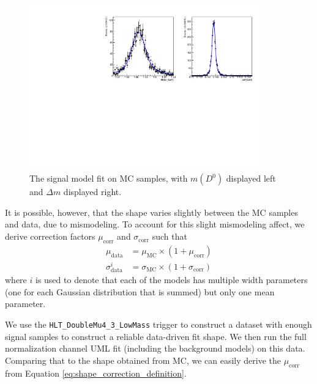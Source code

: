 \begin{figure}[htp]
    \begin{center}
      \includegraphics[width=0.9\textwidth]{figures/chapter4/normalization_fit/dpipi_fit_mc.pdf}
    \end{center}
    \caption{
      The signal model fit on MC samples, with $m(D^0)$ displayed left and $\Delta m$ displayed right.
    }
    \label{fig:d0pipi_uml_fit_pipi_model}
\end{figure}

It is possible, however, that the shape varies slightly between the MC samples and data, due to mismodeling. To account for this slight mismodeling affect, we derive correction factors $\mu_{\text{corr}}$ and $\sigma_{\text{corr}}$ such that
\begin{equation}
\begin{split}
    \mu_{\text{data}} &= \mu_{\text{MC}} \times (1+\mu_{\text{corr}}) \\
    \sigma^i_{\text{data}} &= \sigma_{\text{MC}} \times (1+\sigma_{\text{corr}}) 
\end{split}
\label{eq:shape_correction_definition}
\end{equation}
where $i$ is used to denote that each of the models has multiple width parameters (one for each Gaussian distribution that is summed) but only one mean parameter.

We use the \texttt{HLT\_DoubleMu4\_3\_LowMass} trigger to construct a dataset with enough signal samples to construct a reliable data-driven fit shape. We then run the full normalization channel UML fit (including the background models) on this data. Comparing that to the shape obtained from MC, we can easily derive the $\mu_{\text{corr}}$ from Equation \ref{eq:shape_correction_definition}. 

